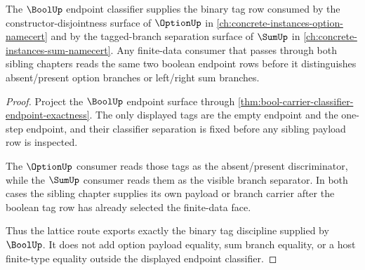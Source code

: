 \begin{theorem}
\label{thm:bool-finite-data-lattice-route}
The $\BoolUp$ endpoint classifier supplies the binary tag row consumed by the
constructor-disjointness surface of $\OptionUp$ in
\autoref{ch:concrete-instances-option-namecert} and by the tagged-branch
separation surface of $\SumUp$ in
\autoref{ch:concrete-instances-sum-namecert}. Any finite-data consumer that
passes through both sibling chapters reads the same two boolean endpoint rows
before it distinguishes absent/present option branches or left/right sum
branches.
\end{theorem}
\begin{proof}
Project the $\BoolUp$ endpoint surface through
\autoref{thm:bool-carrier-classifier-endpoint-exactness}. The only displayed
tags are the empty endpoint and the one-step endpoint, and their classifier
separation is fixed before any sibling payload row is inspected.

The $\OptionUp$ consumer reads those tags as the absent/present discriminator,
while the $\SumUp$ consumer reads them as the visible branch separator. In both
cases the sibling chapter supplies its own payload or branch carrier after the
boolean tag row has already selected the finite-data face.

Thus the lattice route exports exactly the binary tag discipline supplied by
$\BoolUp$. It does not add option payload equality, sum branch equality, or a
host finite-type equality outside the displayed endpoint classifier.
\end{proof}

